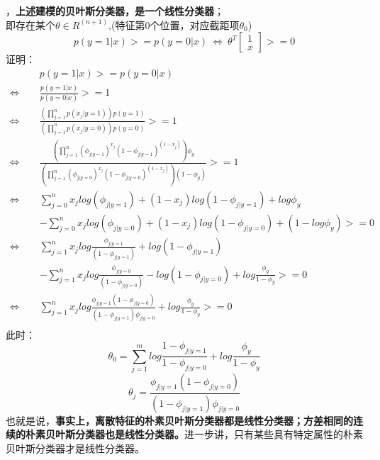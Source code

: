 ，\textbf{上述建模的贝叶斯分类器，是一个线性分类器}；\\即存在某个$\theta\in R^{(n+1)}$,(特征第0个位置，对应截距项$\theta_0$)
$$p(y=1|x)>=p(y=0|x)~\Leftrightarrow~\theta^T \begin{bmatrix}
   1  \\
   x 
  \end{bmatrix}>=0$$
证明：
\begin{equation}\nonumber
\begin{split}
  &p(y=1|x)>=p(y=0|x)\\
  \Leftrightarrow&\frac{p(y=1|x)}{p(y=0|x)}>=1\\
  \Leftrightarrow&\frac{(\prod_{j=1}^{n}p(x_j|y=1))p(y=1)}{(\prod_{j=1}^{n}p(x_j|y=0))p(y=0)}>=1\\
  \Leftrightarrow&\frac{(\prod_{j=1}^{n}(\phi_{j|y=1})^{x_j}(1-\phi_{j|y=1})^{(1-x_j)})\phi_y}{(\prod_{j=1}^{n}(\phi_{j|y=0})^{x_j}(1-\phi_{j|y=0})^{(1-x_j)})(1-\phi_y)}>=1\\
  \Leftrightarrow&\sum_{j=0}^{n}x_j log(\phi_{j|y=1})+(1-x_j)log(1-\phi_{j|y=1})+log\phi_y\\
  ~~~~~~~~~~&-\sum_{j=0}^{n} x_j log(\phi_{j|y=0})+(1-x_j)log(1-\phi_{j|y=0})+(1-log\phi_y)>=0\\
  \Leftrightarrow&\sum_{j=1}^{n}x_jlog\frac{\phi_{j|y=1}}{(1-\phi_{j|y=1})}+log(1-\phi_{j|y=1})\\
  ~~~~~~~~~~&-\sum_{j=1}^{n}x_jlog\frac{\phi_{j|y=0}}{(1-\phi_{j|y=0})}-log(1-\phi_{j|y=0})+log\frac{\phi_y}{1-\phi_y}>=0\\
  \Leftrightarrow&\sum_{j=1}^{n}x_jlog\frac{\phi_{j|y=1}(1-\phi_{j|y=0})}{(1-\phi_{j|y=1})\phi_{j|y=0}}+log\frac{\phi_y}{1-\phi_y}>=0\\
\end{split}
\end{equation}  
此时：$$\theta_0 = \sum_{j=1}^{m} log\frac{1-\phi_{j|y=1}}{1-\phi_{j|y=0}}+log\frac{\phi_y}{1-\phi_y}$$
$$\theta_j=\frac{\phi_{j|y=1}(1-\phi_{j|y=0})}{(1-\phi_{j|y=1})\phi_{j|y=0}}$$
也就是说，{\color{red}{我们拿一个新数据x代入模型测试，利用我们上面得到的线性分类器$\theta^Tx$，与利在朴素贝叶斯比较$p(y=1|x)$与$p(y=0|x)$是等效的。}}\textbf{事实上，离散特征的朴素贝叶斯分类器都是线性分类器；方差相同的连续的朴素贝叶斯分类器也是线性分类器。}进一步讲，只有某些具有特定属性的朴素贝叶斯分类器才是线性分类器。

